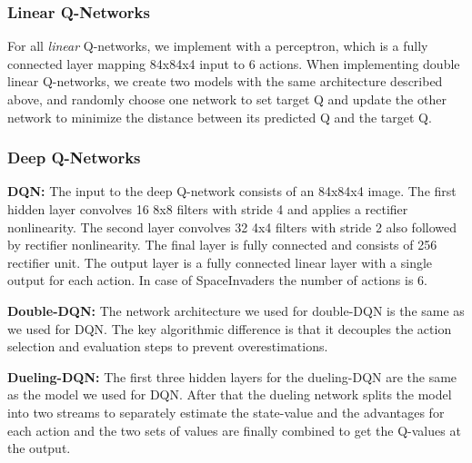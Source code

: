 \documentclass{article}
\begin{document}
\subsubsection{Linear Q-Networks}
For all {\em linear} Q-networks, we implement with a perceptron, which is a fully connected layer mapping 84x84x4 input to 6 actions. When implementing double linear Q-networks, we create two models with the same architecture described above, and randomly choose one network to set target Q and update the other network to minimize the distance between its predicted Q and the target Q.

\subsubsection{Deep Q-Networks} 
{\bf DQN:} The input to the deep Q-network consists of an 84x84x4 image. The first hidden layer convolves 16 8x8 filters with stride 4 and applies a rectifier nonlinearity. The second layer convolves 32 4x4 filters with stride 2 also followed by rectifier nonlinearity. The final layer is fully connected and consists of 256 rectifier unit. The output layer is a fully connected linear layer with a single output for each action. In case of SpaceInvaders the number of actions is 6.

{\bf Double-DQN:} The network architecture we used for double-DQN is the same as we used for DQN. The key algorithmic difference is that it decouples the action selection and evaluation steps to prevent overestimations.

{\bf Dueling-DQN:} The first three hidden layers for the dueling-DQN are the same as the model we used for DQN. After that the dueling network splits the model into two streams to separately estimate the state-value and the advantages for each action and the two sets of values are finally combined to get the Q-values at the output.



\end{document}
